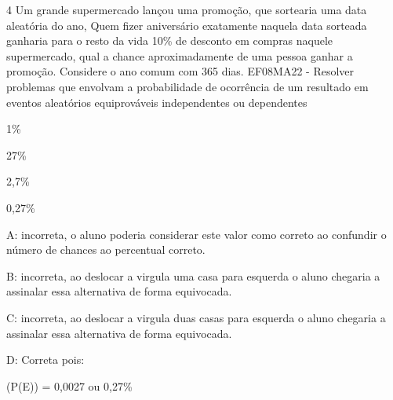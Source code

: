 \num{4} Um grande supermercado lançou uma promoção, que sortearia uma data
aleatória do ano, Quem fizer aniversário exatamente naquela data
sorteada ganharia para o resto da vida 10\% de desconto em compras
naquele supermercado, qual a chance aproximadamente de uma pessoa ganhar
a promoção. Considere o ano comum com 365 dias. EF08MA22 - Resolver
problemas que envolvam a probabilidade de ocorrência de um resultado em
eventos aleatórios equiprováveis independentes ou dependentes

\item 1\%
\item 27\%
\item 2,7\%
\item 0,27\%

A: incorreta, o aluno poderia considerar este valor como correto ao
confundir o número de chances ao percentual correto.

B: incorreta, ao deslocar a virgula uma casa para esquerda o aluno
chegaria a assinalar essa alternativa de forma equivocada.

C: incorreta, ao deslocar a virgula duas casas para esquerda o aluno
chegaria a assinalar essa alternativa de forma equivocada.

D: Correta pois:

(P(E)) = 0,0027 ou 0,27\%
